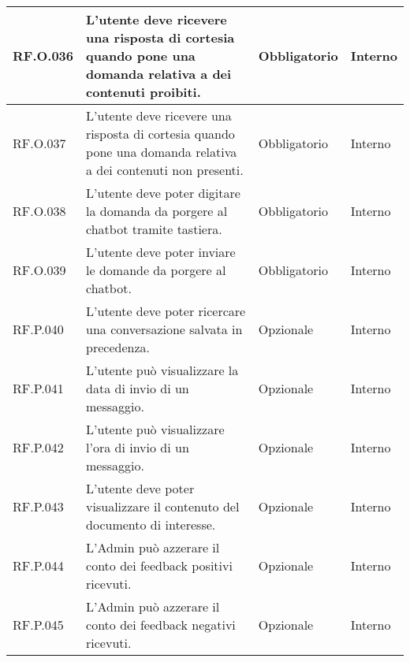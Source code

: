 \begin{longtable}{|C{2.7cm}|L{7.2cm}|C{2.7cm}|C{2cm}|}
        \hline
        RF.O.036 & L’utente deve ricevere una risposta di cortesia quando pone una domanda relativa a dei contenuti proibiti.
         & Obbligatorio & Interno \\
        \hline
        RF.O.037 & L’utente deve ricevere una risposta di cortesia quando pone una domanda relativa a dei contenuti non presenti.
         & Obbligatorio & Interno \\
        \hline
        RF.O.038 & L’utente deve poter digitare la domanda da porgere al chatbot tramite tastiera.
         & Obbligatorio & Interno \\
        \hline
        RF.O.039 & L’utente deve poter inviare le domande da porgere al chatbot.
         & Obbligatorio & Interno \\
        \hline
        RF.P.040 & L’utente deve poter ricercare una conversazione salvata in precedenza.
         & Opzionale & Interno \\
        \hline
        RF.P.041 & L’utente può visualizzare la data di invio di un messaggio.
         & Opzionale & Interno \\
        \hline
        RF.P.042 & L’utente può visualizzare l'ora di invio di un messaggio.
         & Opzionale & Interno \\
        \hline
        RF.P.043 & L’utente deve poter visualizzare il contenuto del documento di interesse.
         & Opzionale & Interno \\
        \hline
        RF.P.044 & L'Admin può azzerare il conto dei feedback positivi ricevuti.
         & Opzionale & Interno \\
        \hline
        RF.P.045 & L'Admin può azzerare il conto dei feedback negativi ricevuti.
         & Opzionale & Interno \\
        \hline
        
        


\end{longtable}

\newpage